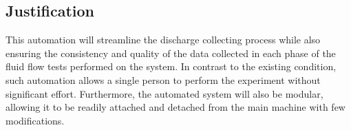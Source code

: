 

\subsection{Justification}
This automation will streamline the discharge collecting process while also ensuring the consistency and quality of the data collected in each phase of the fluid flow tests performed on the system. In contrast to the existing condition, such automation allows a single person to perform the experiment without significant effort. Furthermore, the automated system will also be modular, allowing it to be readily attached and detached from the main machine with few modifications.
